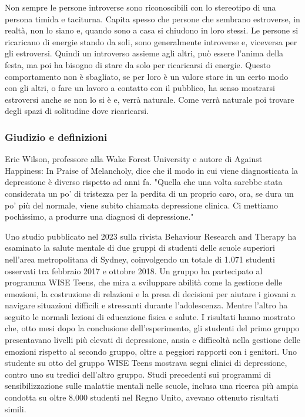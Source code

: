 \documentclass[12pt]{book} %
\begin{document}
\begin{mdframed}[linewidth=1pt]
Non sempre le persone introverse sono riconoscibili con lo stereotipo di una persona timida e taciturna. Capita spesso
che persone che sembrano estroverse, in realtà, non lo siano e, quando sono a casa si chiudono in loro stessi. 
Le persone si ricaricano di energie stando da soli, sono generalmente introverse e, viceversa per gli estroversi. Quindi un introverso assieme agli altri,
può essere l'anima della festa, ma poi ha bisogno di stare da solo per ricaricarsi di energie. Questo
comportamento non è sbagliato, se per loro è un valore stare in un certo modo con gli altri, o fare un lavoro a contatto
con il pubblico, ha senso mostrarsi estroversi anche se non lo si è e, verrà naturale. Come verrà naturale poi trovare
degli spazi di solitudine dove ricaricarsi.
\end{mdframed}

\subsubsection{Giudizio e definizioni}
Eric Wilson, professore alla Wake Forest University e autore di Against Happiness: In Praise of Melancholy, dice che il
modo in cui viene diagnosticata la depressione è diverso rispetto ad anni fa. "Quella che una volta
sarebbe stata considerata un po' di tristezza per la perdita di un proprio caro, ora, se dura un po' più del normale,
viene subito chiamata depressione clinica. Ci mettiamo pochissimo, a produrre una diagnosi di
depressione."

Uno studio pubblicato nel 2023 sulla rivista Behaviour Research and Therapy ha esaminato la salute mentale di due gruppi di studenti delle scuole superiori nell’area metropolitana di Sydney, coinvolgendo un totale di 1.071 studenti osservati tra febbraio 2017 e ottobre 2018. Un gruppo ha partecipato al programma WISE Teens, che mira a sviluppare abilità come la gestione delle emozioni, la costruzione di relazioni e la presa di decisioni per aiutare i giovani a navigare situazioni difficili e stressanti durante l’adolescenza. Mentre l’altro ha seguito le normali lezioni di educazione fisica e salute. I risultati hanno mostrato che, otto mesi dopo la conclusione dell’esperimento, gli studenti del primo gruppo presentavano livelli più elevati di depressione, ansia e difficoltà nella gestione delle emozioni rispetto al secondo gruppo, oltre a peggiori rapporti con i genitori. Uno studente su otto del gruppo WISE Teens mostrava segni clinici di depressione, contro uno su tredici dell’altro gruppo.
Studi precedenti sui programmi di sensibilizzazione sulle malattie mentali nelle scuole, inclusa una ricerca più ampia condotta su oltre 8.000 studenti nel Regno Unito, avevano ottenuto risultati simili.
\end{document}
